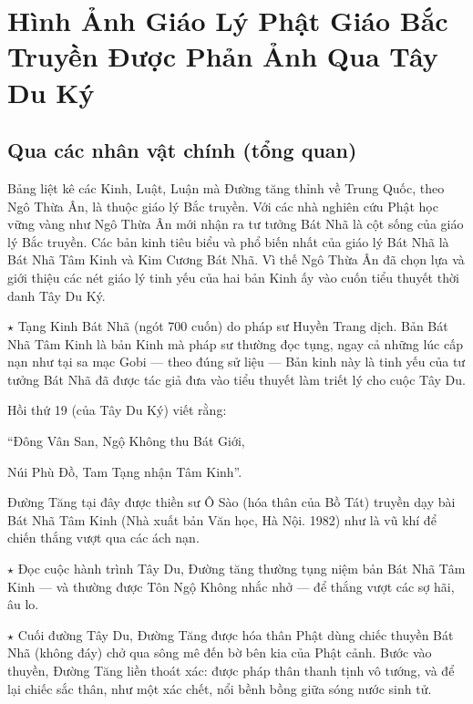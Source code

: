 \chapter{Hình Ảnh Giáo Lý Phật Giáo Bắc Truyền Được Phản Ảnh Qua Tây Du Ký} %
\label{cha:hinh_anh_giao_ly_phat_giao_bac_truyen}

\section{Qua các nhân vật chính (tổng quan)} %
\label{sec:qua_cac_nhan_vat_chinh}

Bảng liệt kê các Kinh, Luật, Luận mà Đường tăng thỉnh về Trung Quốc, theo Ngô Thừa Ân, là thuộc giáo lý Bắc truyền. Với các nhà nghiên cứu Phật học vững vàng như Ngô Thừa Ân mới nhận ra tư tưởng Bát Nhã là cột sống của giáo lý Bắc truyền. Các bản kinh tiêu biểu và phổ biến nhất của giáo lý Bát Nhã là Bát Nhã Tâm Kinh và Kim Cương Bát Nhã. Vì thế Ngô Thừa Ân đã chọn lựa và giới thiệu các nét giáo lý tinh yếu của hai bản Kinh ấy vào cuốn tiểu thuyết thời danh Tây Du Ký.

$\star$ Tạng Kinh Bát Nhã (ngót 700 cuốn) do pháp sư Huyền Trang dịch. Bản Bát Nhã Tâm Kinh là bản Kinh mà pháp sư thường đọc tụng, ngay cả những lúc cấp nạn như tại sa mạc Gobi — theo đúng sử liệu — Bản kinh này là tinh yếu của tư tưởng Bát Nhã đã được tác giả đưa vào tiểu thuyết làm triết lý cho cuộc Tây Du.

Hồi thứ 19 (của Tây Du Ký) viết rằng:

\begin{itshape}
``Đông Vân San, Ngộ Không thu Bát Giới,

Núi Phù Đồ, Tam Tạng nhận Tâm Kinh''.
\end{itshape}

Đường Tăng tại đây được thiền sư Ô Sào (hóa thân của Bồ Tát) truyền dạy bài Bát Nhã Tâm Kinh (Nhà xuất bản Văn học, Hà Nội. 1982) như là vũ khí để chiến thắng vượt qua các ách nạn.

$\star$ Đọc cuộc hành trình Tây Du, Đường tăng thường tụng niệm bản Bát Nhã Tâm Kinh — và thường được Tôn Ngộ Không nhắc nhở — để thắng vượt các sợ hãi, âu lo.

$\star$ Cuối đường Tây Du, Đường Tăng được hóa thân Phật dùng chiếc thuyền Bát Nhã (không đáy) chở qua sông mê đến bờ bên kia của Phật cảnh. Bước vào thuyền, Đường Tăng liền thoát xác: được pháp thân thanh tịnh vô tướng, và để lại chiếc sắc thân, như một xác chết, nổi bềnh bồng giữa sóng nước sinh tử.

